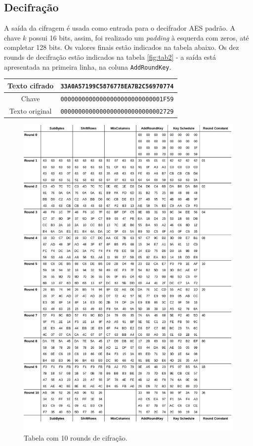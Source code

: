 \documentclass{article}
\begin{document}
\subsection{Decifração}
A saída da cifragem é usada como entrada para o decifrador AES padrão. A chave
$k$ possui 16 bits, assim, foi realizado um \textit{padding} à esquerda com
zeros, até completar 128 bits. Os valores finais estão indicados na tabela
abaixo. Os dez rounds de decifração estão indicados na tabela \ref{fig:tab2} -
a saída está apresentada na primeira linha, na coluna \texttt{AddRoundKey}.
\begin{center}
    \begin{tabular}{|c|c|}
        \hline
        Texto cifrado & \texttt{33A0A57199C5876778EA7B2C56970774} \\
        \hline
        Chave & \texttt{00000000000000000000000000001F59} \\
        \hline
        Texto original & \texttt{00000000000000000000000000002729} \\
        \hline
    \end{tabular}
\end{center}

\begin{figure}
    \centering
    \includegraphics[width=1\linewidth]{imgs/table_aes_ciph.jpg}
    \caption{Tabela com 10 rounds de cifração.}
    \label{fig:tab1}
\end{figure}
\end{document}
